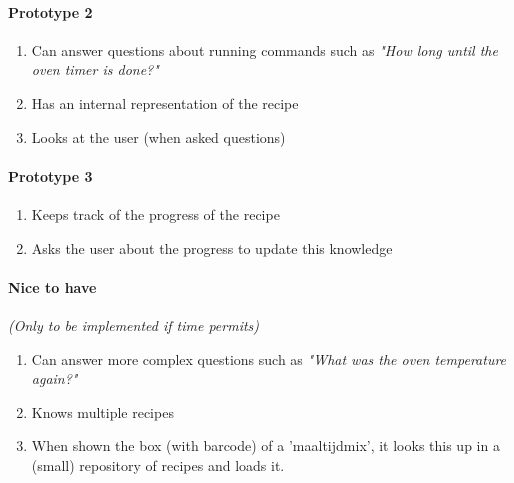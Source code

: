 \documentclass[11pt]{article} %
\begin{document}
\paragraph{Prototype 2}
\begin{enumerate}
\item Can answer questions about running commands such as \emph{"How long until the oven timer is done?"}
\item Has an internal representation of the recipe
\item Looks at the user (when asked questions)

\end{enumerate}

\paragraph{Prototype 3}
\begin{enumerate}
\item Keeps track of the progress of the recipe
\item Asks the user about the progress to update this knowledge

\end{enumerate}


\paragraph{Nice to have}
\emph{(Only to be implemented if time permits)}

\begin{enumerate}
\item Can answer more complex questions such as \emph{"What was the oven temperature again?"}
\item Knows multiple recipes
\item When shown the box (with barcode) of a 'maaltijdmix', it looks this up in a (small) repository of recipes and loads it.

\end{enumerate}





\end{document}
